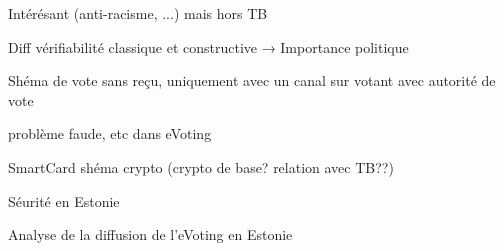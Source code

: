 \documentclass[../report]{subfiles}
\begin{document}

  Intérésant (anti-racisme, ...) mais hors TB

  

  Diff vérifiabilité classique et constructive → Importance politique


  Shéma de vote sans reçu, uniquement avec un canal sur votant avec autorité de vote


  problème faude, etc dans eVoting


  SmartCard shéma crypto (crypto de base? relation avec TB??)


  Séurité en Estonie


  Analyse de la diffusion de l'eVoting en Estonie

  
\end{document}
